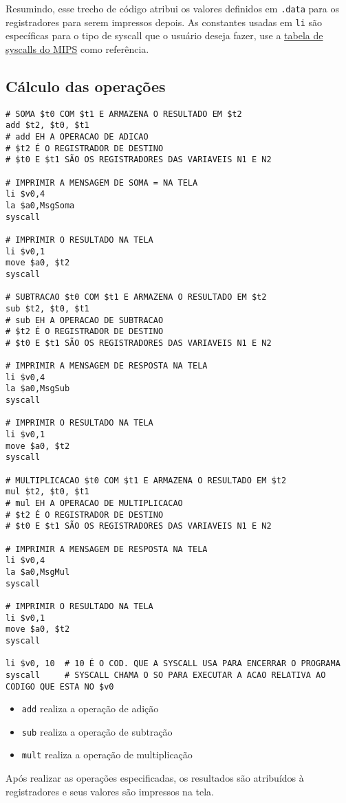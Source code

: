 \documentclass{article}
\begin{document}
Resumindo, esse trecho de código atribui os valores definidos em \texttt{.data} para os registradores para serem impressos depois. As constantes usadas em \texttt{li} são específicas para o tipo de syscall que o usuário deseja fazer, use a \href{https://courses.missouristate.edu/kenvollmar/mars/help/syscallhelp.html}{tabela de syscalls do MIPS} como referência.

\subsection{Cálculo das operações}

\begin{verbatim}
# SOMA $t0 COM $t1 E ARMAZENA O RESULTADO EM $t2
add $t2, $t0, $t1
# add EH A OPERACAO DE ADICAO
# $t2 É O REGISTRADOR DE DESTINO
# $t0 E $t1 SÃO OS REGISTRADORES DAS VARIAVEIS N1 E N2

# IMPRIMIR A MENSAGEM DE SOMA = NA TELA
li $v0,4
la $a0,MsgSoma
syscall

# IMPRIMIR O RESULTADO NA TELA
li $v0,1
move $a0, $t2
syscall

# SUBTRACAO $t0 COM $t1 E ARMAZENA O RESULTADO EM $t2
sub $t2, $t0, $t1
# sub EH A OPERACAO DE SUBTRACAO
# $t2 É O REGISTRADOR DE DESTINO
# $t0 E $t1 SÃO OS REGISTRADORES DAS VARIAVEIS N1 E N2

# IMPRIMIR A MENSAGEM DE RESPOSTA NA TELA
li $v0,4
la $a0,MsgSub
syscall

# IMPRIMIR O RESULTADO NA TELA
li $v0,1
move $a0, $t2
syscall

# MULTIPLICACAO $t0 COM $t1 E ARMAZENA O RESULTADO EM $t2
mul $t2, $t0, $t1
# mul EH A OPERACAO DE MULTIPLICACAO
# $t2 É O REGISTRADOR DE DESTINO
# $t0 E $t1 SÃO OS REGISTRADORES DAS VARIAVEIS N1 E N2

# IMPRIMIR A MENSAGEM DE RESPOSTA NA TELA
li $v0,4
la $a0,MsgMul
syscall

# IMPRIMIR O RESULTADO NA TELA
li $v0,1
move $a0, $t2
syscall

li $v0, 10	# 10 É O COD. QUE A SYSCALL USA PARA ENCERRAR O PROGRAMA
syscall		# SYSCALL CHAMA O SO PARA EXECUTAR A ACAO RELATIVA AO CODIGO QUE ESTA NO $v0
\end{verbatim}

\begin{itemize}
    \item \texttt{add} realiza a operação de adição
    \item \texttt{sub} realiza a operação de subtração
    \item \texttt{mult} realiza a operação de multiplicação
\end{itemize}
Após realizar as operações especificadas, os resultados são atribuídos à registradores e seus valores são impressos na tela.
\end{document}
